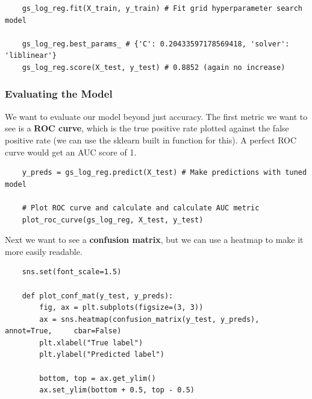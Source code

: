 \documentclass[11pt, a4paper]{article}
\begin{document}
\begin{spacing}{1.1}
\begin{lstlisting}
	gs_log_reg.fit(X_train, y_train) # Fit grid hyperparameter search model
	
	gs_log_reg.best_params_ # {'C': 0.20433597178569418, 'solver': 'liblinear'}
	gs_log_reg.score(X_test, y_test) # 0.8852 (again no increase) \end{lstlisting} \vspace*{1mm}
	\subsubsection{Evaluating the Model}
	We want to evaluate our model beyond just accuracy. The first metric we want to see is a \textbf{ROC curve}, which is the true positive rate plotted against the false positive rate (we can use the sklearn built in function for this). A perfect ROC curve would get an AUC score of 1. 
	\begin{lstlisting}
	y_preds = gs_log_reg.predict(X_test) # Make predictions with tuned model
	
	# Plot ROC curve and calculate and calculate AUC metric
	plot_roc_curve(gs_log_reg, X_test, y_test) \end{lstlisting} \vspace*{1mm}
	Next we want to see a \textbf{confusion matrix}, but we can use a heatmap to make it more easily readable.
	\begin{lstlisting}
	sns.set(font_scale=1.5)
	
	def plot_conf_mat(y_test, y_preds):
		fig, ax = plt.subplots(figsize=(3, 3))
		ax = sns.heatmap(confusion_matrix(y_test, y_preds),	annot=True, 	cbar=False)
		plt.xlabel("True label")
		plt.ylabel("Predicted label")
		
		bottom, top = ax.get_ylim()
		ax.set_ylim(bottom + 0.5, top - 0.5)
	

\end{lstlisting}
\end{spacing}
\end{document}
